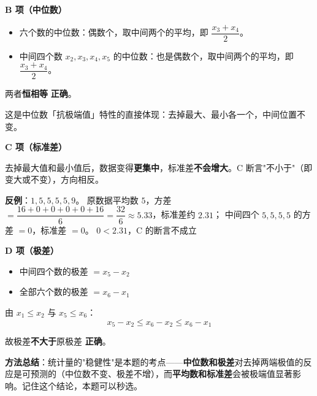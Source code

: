 \par\medskip

\textbf{B 项（中位数）}

\begin{itemize}
\item 六个数的中位数：偶数个，取中间两个的平均，即 $\dfrac{x_3+x_4}2$。
\item 中间四个数 $x_2,x_3,x_4,x_5$ 的中位数：也是偶数个，取中间两个的平均，即 $\dfrac{x_3+x_4}2$。
\end{itemize}

两者\textbf{恒相等}  \textbf{正确}。

\begin{gktip}
这是中位数「抗极端值」特性的直接体现：去掉最大、最小各一个，中间位置不变。
\end{gktip}

\par\medskip

\textbf{C 项（标准差）}

去掉最大值和最小值后，数据变得\textbf{更集中}，标准差\textbf{不会增大}。C 断言"不小于"（即变大或不变），方向相反。

\textbf{反例}：$1,5,5,5,5,9$。
原数据平均数 $5$，方差 $=\dfrac{16+0+0+0+0+16}6=\dfrac{32}6\approx5.33$，标准差约 $2.31$；
中间四个 $5,5,5,5$ 的方差 $=0$，标准差 $=0$。
$0<2.31$，C 的断言不成立 

\par\medskip

\textbf{D 项（极差）}

\begin{itemize}
\item 中间四个数的极差 $=x_5-x_2$
\item 全部六个数的极差 $=x_6-x_1$
\end{itemize}

由 $x_1\le x_2$ 与 $x_5\le x_6$：
\[x_5-x_2\le x_6-x_2\le x_6-x_1\]

故极差\textbf{不大于}原极差  \textbf{正确}。


\begin{gktip}
\textbf{方法总结}：统计量的"稳健性"是本题的考点——\textbf{中位数和极差}对去掉两端极值的反应是可预测的（中位数不变、极差不增），而\textbf{平均数和标准差}会被极端值显著影响。记住这个结论，本题可以秒选。
\end{gktip}

\par\medskip


